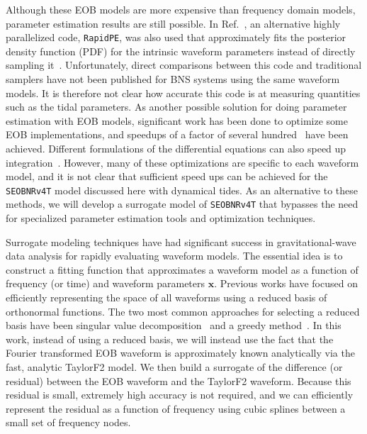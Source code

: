 \documentclass[prd,aps,letter,twocolumn,floatfix,notitlepage,nofootinbib]{revtex4-1}
\def\bx{\mathbf{x}}
\begin{document}
Although these EOB models are more expensive than frequency domain models, parameter estimation results are still possible. In Ref.~\cite{BNSPE}, an alternative highly parallelized code, \texttt{RapidPE}, was also used that approximately fits the posterior density function (PDF) for the intrinsic waveform parameters instead of directly sampling it~\cite{PankowBradyOchsner2015, LangeOshaughnessyRizzo2018}. Unfortunately, direct comparisons between this code and traditional samplers have not been published for BNS systems using the same waveform models. It is therefore not clear how accurate this code is at measuring quantities such as the tidal parameters. As another possible solution for doing parameter estimation with EOB models, significant work has been done to optimize some EOB implementations, and speedups of a factor of several hundred~\cite{DevineEtienneMcWilliams2016} have been achieved. Different formulations of the differential equations can also speed up integration~\cite{NagarNettegno2018}. However, many of these optimizations are specific to each waveform model, and it is not clear that sufficient speed ups can be achieved for the \texttt{SEOBNRv4T} model discussed here with dynamical tides. As an alternative to these methods, we will develop a surrogate model of \texttt{SEOBNRv4T} that bypasses the need for specialized parameter estimation tools and optimization techniques. 

Surrogate modeling techniques have had significant success in gravitational-wave data analysis for rapidly evaluating waveform models. The essential idea is to construct a fitting function that approximates a waveform model as a function of frequency (or time) and waveform parameters $\bx$. Previous works have focused on efficiently representing the space of all waveforms using a reduced basis of orthonormal functions.
The two most common approaches for selecting a reduced basis have been singular value decomposition~\cite{Puerrer2014, Puerrer2015} and a greedy method~\cite{FieldGalleyHesthaven2014, LackeyBernuzziGalley2017, BlackmanFieldGalley2015, BlackmanFieldScheel2017a, BlackmanFieldScheel2017b}.
In this work, instead of using a reduced basis, we will instead use the fact that the Fourier transformed EOB waveform is approximately known analytically via the fast, analytic TaylorF2 model. We then build a surrogate of the difference (or residual) between the EOB waveform and the TaylorF2 waveform. Because this residual is small, extremely high accuracy is not required, and we can efficiently represent the residual as a function of frequency using cubic splines between a small set of frequency nodes.
\end{document}
